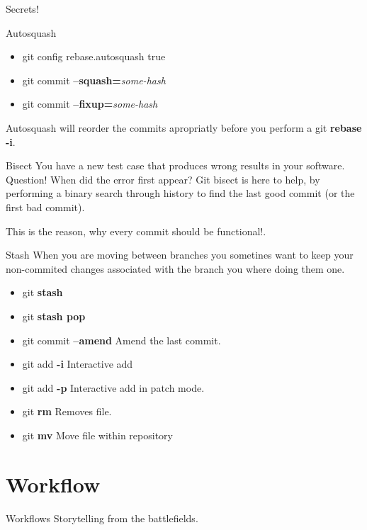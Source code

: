 \documentclass{beamer}
\begin{document}
\begin{frame}[allowframebreaks]{Secrets!}
  \begin{block}{Autosquash}
    \begin{itemize}
      \item git config rebase.autosquash true
      \item git commit \textbf{--squash=}\emph{some-hash}
      \item git commit \textbf{--fixup=}\emph{some-hash}
     \end{itemize}
     Autosquash will reorder the commits apropriatly before you perform a git \textbf{rebase -i}.
  \end{block}
  \begin{block}{Bisect}
    You have a new test case that produces wrong results in your software. Question! When did the error first appear? Git bisect is here to help, by performing a binary search through history to find the last good commit (or the first bad commit).

    This is the reason, why every commit should be functional!.
  \end{block}
  \framebreak
  \begin{block}{Stash}
    When you are moving between branches you sometines want to keep your non-commited changes associated with the branch you where doing them one.
    \begin{itemize}
      \item git \textbf{stash}
      \item git \textbf{stash pop}
    \end{itemize}
  \end{block}

  \begin{itemize}
    \item git commit \textbf{--amend} Amend the last commit.
    \item git add \textbf{-i} Interactive add
    \item git add \textbf{-p} Interactive add in patch mode.
    \item git \textbf{rm} Removes file.
    \item git \textbf{mv} Move file within repository
  \end{itemize}
\end{frame}
\section{Workflow}
\begin{frame}[fragile]{Workflows}
  \centering
  Storytelling from the battlefields.
\end{frame}
\end{document}
